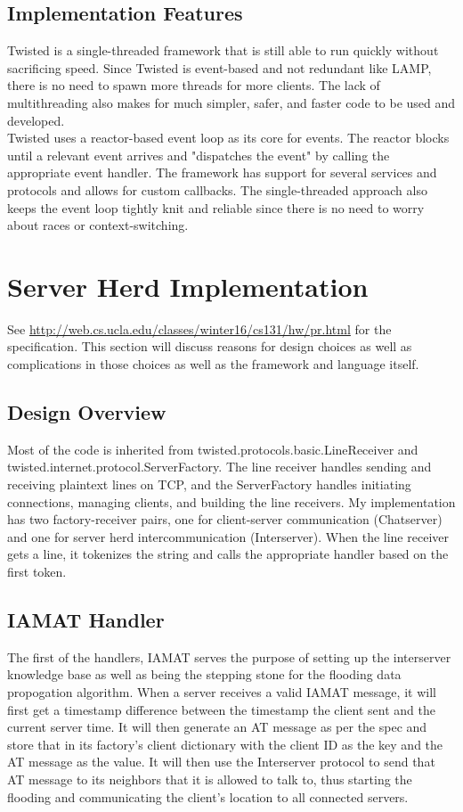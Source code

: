 \documentclass[letterpaper,twocolumn,10pt]{article}
\begin{document}
\subsection{Implementation Features}
Twisted is a single-threaded framework that is still able to run quickly without sacrificing speed. Since Twisted is event-based and not redundant like LAMP, there is no need to spawn more threads for more clients. The lack of multithreading also makes for much simpler, safer, and faster code to be used and developed. \\

Twisted uses a reactor-based event loop as its core for events. The reactor blocks until a relevant event arrives and "dispatches the event" by calling the appropriate event handler. The framework has support for several services and protocols and allows for custom callbacks. The single-threaded approach also keeps the event loop tightly knit and reliable since there is no need to worry about races or context-switching.

\section{Server Herd Implementation}
See \url{http://web.cs.ucla.edu/classes/winter16/cs131/hw/pr.html} for the specification. This section will discuss reasons for design choices as well as complications in those choices as well as the framework and language itself.
\subsection{Design Overview}
Most of the code is inherited from twisted.protocols.basic.LineReceiver and twisted.internet.protocol.ServerFactory. The line receiver handles sending and receiving plaintext lines on TCP, and the ServerFactory handles initiating connections, managing clients, and building the line receivers. My implementation has two factory-receiver pairs, one for client-server communication (Chatserver) and one for server herd intercommunication (Interserver). When the line receiver gets a line, it tokenizes the string and calls the appropriate handler based on the first token.

\subsection{IAMAT Handler}
The first of the handlers, IAMAT serves the purpose of setting up the interserver knowledge base as well as being the stepping stone for the flooding data propogation algorithm. When a server receives a valid IAMAT message, it will first get a timestamp difference between the timestamp the client sent and the current server time. It will then generate an AT message as per the spec and store that in its factory's client dictionary with the client ID as the key and the AT message as the value. It will then use the Interserver protocol to send that AT message to its neighbors that it is allowed to talk to, thus starting the flooding and communicating the client's location to all connected servers. 
\end{document}
